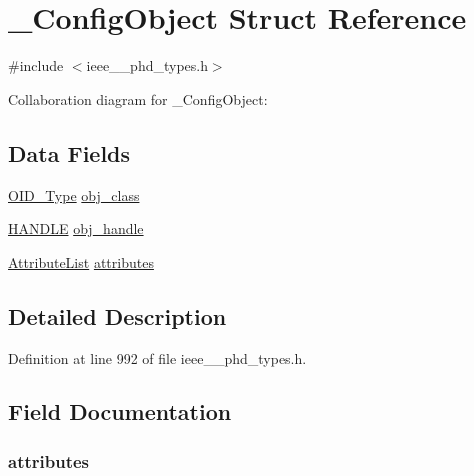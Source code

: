 \hypertarget{struct___config_object}{}\section{\+\_\+\+Config\+Object Struct Reference}
\label{struct___config_object}


{\ttfamily \#include $<$ieee\+\_\+\_\+phd\+\_\+types.\+h$>$}



Collaboration diagram for \+\_\+\+Config\+Object\+:
\subsection*{Data Fields}
\begin{DoxyCompactItemize}
\item 
\hyperlink{ieee__11073__phd__types_8h_aa4d7af235d4a95d6632aa0d64160dd62}{O\+I\+D\+\_\+\+Type} \hyperlink{struct___config_object_a159d7983c34c4db7f58243490ff847c1}{obj\+\_\+class}
\item 
\hyperlink{ieee__11073__phd__types_8h_a76f0d44d294babf2e568f7ee676ffca6}{H\+A\+N\+D\+L\+E} \hyperlink{struct___config_object_abbfff52b7a4956021522f5750c4b32c6}{obj\+\_\+handle}
\item 
\hyperlink{ieee__11073__phd__types_8h_a87a34d3be532804006242c172e4beea2}{Attribute\+List} \hyperlink{struct___config_object_aa10e6a803609d25fcb5bda2611706823}{attributes}
\end{DoxyCompactItemize}


\subsection{Detailed Description}


Definition at line 992 of file ieee\+\_\+\_\+phd\+\_\+types.\+h.



\subsection{Field Documentation}
\hypertarget{struct___config_object_aa10e6a803609d25fcb5bda2611706823}{}
\subsubsection[{attributes}]{ attributes}\label{struct___config_object_aa10e6a803609d25fcb5bda2611706823}



